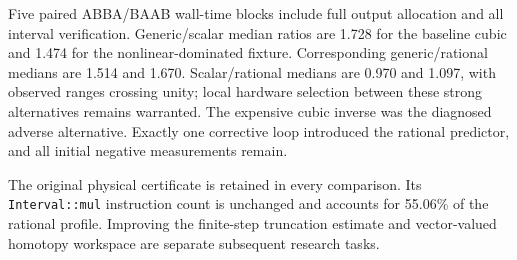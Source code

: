 Five paired ABBA/BAAB wall-time blocks include full output allocation and
all interval verification.  Generic/scalar median ratios are 1.728 for the
baseline cubic and 1.474 for the nonlinear-dominated fixture.  Corresponding
generic/rational medians are 1.514 and 1.670.  Scalar/rational medians are
0.970 and 1.097, with observed ranges crossing unity; local hardware selection
between these strong alternatives remains warranted.  The expensive cubic
inverse was the diagnosed adverse alternative.  Exactly one corrective loop
introduced the rational predictor, and all initial negative measurements remain.

The original physical certificate is retained in every comparison.  Its
\texttt{Interval::mul} instruction count is unchanged and accounts for 55.06\%
of the rational profile.  Improving the finite-step truncation estimate and
vector-valued homotopy workspace are separate subsequent research tasks.
